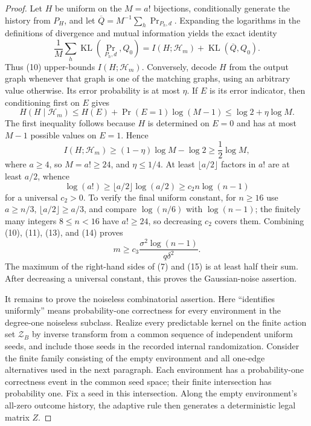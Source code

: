 \documentclass{article}
\begin{document}
\begin{proof}
Let \(H\) be uniform on the \(M=a!\) bijections, conditionally generate the history from \(P_H\), and let \(\overline Q=M^{-1}\sum_h\Pr_{P_h,d}\).  Expanding the logarithms in the definitions of divergence and mutual information yields the exact identity
\[
 \frac1M\sum_h\operatorname{KL}(\Pr_{P_h,d},Q_0)
 =I(H;\mathscr H_m)+\operatorname{KL}(\overline Q,Q_0). \tag{11}
\]
Thus (10) upper-bounds \(I(H;\mathscr H_m)\).  Conversely, decode \(H\) from the output graph whenever that graph is one of the matching graphs, using an arbitrary value otherwise.  Its error probability is at most \(\eta\).  If \(E\) is its error indicator, then conditioning first on \(E\) gives
\[
 H(H\mid\mathscr H_m)
 \le H(E)+\Pr(E=1)\log(M-1)
 \le\log2+\eta\log M. \tag{12}
\]
The first inequality follows because \(H\) is determined on \(E=0\) and has at most \(M-1\) possible values on \(E=1\).  Hence
\[
 I(H;\mathscr H_m)\ge(1-\eta)\log M-\log2\ge\frac12\log M, \tag{13}
\]
where \(a\ge4\), so \(M=a!\ge24\), and \(\eta\le1/4\).  At least \(\lfloor a/2\rfloor\) factors in \(a!\) are at least \(a/2\), whence
\[
 \log(a!)\ge\lfloor a/2\rfloor\log(a/2)\ge c_2n\log(n-1) \tag{14}
\]
for a universal \(c_2>0\).  To verify the final uniform constant, for \(n\ge16\) use \(a\ge n/3\), \(\lfloor a/2\rfloor\ge a/3\), and compare \(\log(n/6)\) with \(\log(n-1)\); the finitely many integers \(8\le n<16\) have \(a!\ge24\), so decreasing \(c_2\) covers them.  Combining (10), (11), (13), and (14) proves
\[
 m\ge c_3\frac{\sigma^2\log(n-1)}{q\delta^2}. \tag{15}
\]
The maximum of the right-hand sides of (7) and (15) is at least half their sum.  After decreasing a universal constant, this proves the Gaussian-noise assertion.

It remains to prove the noiseless combinatorial assertion.  Here ``identifies uniformly'' means probability-one correctness for every environment in the degree-one noiseless subclass.  Realize every predictable kernel on the finite action set \(\mathcal Z_B\) by inverse transform from a common sequence of independent uniform seeds, and include those seeds in the recorded internal randomization.  Consider the finite family consisting of the empty environment and all one-edge alternatives used in the next paragraph.  Each environment has a probability-one correctness event in the common seed space; their finite intersection has probability one.  Fix a seed in this intersection.  Along the empty environment's all-zero outcome history, the adaptive rule then generates a deterministic legal matrix \(Z\).


\end{proof}
\end{document}
